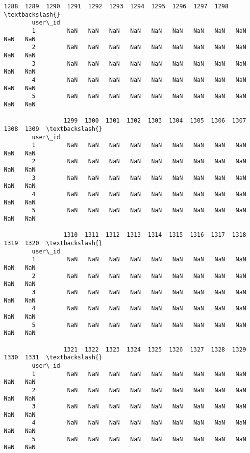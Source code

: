 \documentclass[11pt]{article}
\begin{document}
\begin{Verbatim}[commandchars=\\\{\}]
                 1288  1289  1290  1291  1292  1293  1294  1295  1296  1297  1298  \textbackslash{}
        user\_id                                                                     
        1         NaN   NaN   NaN   NaN   NaN   NaN   NaN   NaN   NaN   NaN   NaN   
        2         NaN   NaN   NaN   NaN   NaN   NaN   NaN   NaN   NaN   NaN   NaN   
        3         NaN   NaN   NaN   NaN   NaN   NaN   NaN   NaN   NaN   NaN   NaN   
        4         NaN   NaN   NaN   NaN   NaN   NaN   NaN   NaN   NaN   NaN   NaN   
        5         NaN   NaN   NaN   NaN   NaN   NaN   NaN   NaN   NaN   NaN   NaN   
        
                 1299  1300  1301  1302  1303  1304  1305  1306  1307  1308  1309  \textbackslash{}
        user\_id                                                                     
        1         NaN   NaN   NaN   NaN   NaN   NaN   NaN   NaN   NaN   NaN   NaN   
        2         NaN   NaN   NaN   NaN   NaN   NaN   NaN   NaN   NaN   NaN   NaN   
        3         NaN   NaN   NaN   NaN   NaN   NaN   NaN   NaN   NaN   NaN   NaN   
        4         NaN   NaN   NaN   NaN   NaN   NaN   NaN   NaN   NaN   NaN   NaN   
        5         NaN   NaN   NaN   NaN   NaN   NaN   NaN   NaN   NaN   NaN   NaN   
        
                 1310  1311  1312  1313  1314  1315  1316  1317  1318  1319  1320  \textbackslash{}
        user\_id                                                                     
        1         NaN   NaN   NaN   NaN   NaN   NaN   NaN   NaN   NaN   NaN   NaN   
        2         NaN   NaN   NaN   NaN   NaN   NaN   NaN   NaN   NaN   NaN   NaN   
        3         NaN   NaN   NaN   NaN   NaN   NaN   NaN   NaN   NaN   NaN   NaN   
        4         NaN   NaN   NaN   NaN   NaN   NaN   NaN   NaN   NaN   NaN   NaN   
        5         NaN   NaN   NaN   NaN   NaN   NaN   NaN   NaN   NaN   NaN   NaN   
        
                 1321  1322  1323  1324  1325  1326  1327  1328  1329  1330  1331  \textbackslash{}
        user\_id                                                                     
        1         NaN   NaN   NaN   NaN   NaN   NaN   NaN   NaN   NaN   NaN   NaN   
        2         NaN   NaN   NaN   NaN   NaN   NaN   NaN   NaN   NaN   NaN   NaN   
        3         NaN   NaN   NaN   NaN   NaN   NaN   NaN   NaN   NaN   NaN   NaN   
        4         NaN   NaN   NaN   NaN   NaN   NaN   NaN   NaN   NaN   NaN   NaN   
        5         NaN   NaN   NaN   NaN   NaN   NaN   NaN   NaN   NaN   NaN   NaN   
        

\end{Verbatim}
\end{document}
